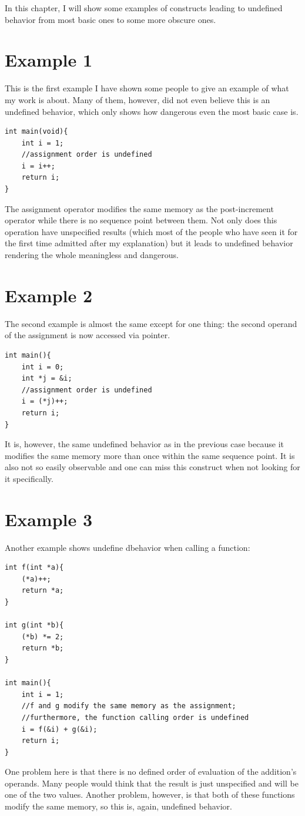 In this chapter, I will show some examples of constructs leading to undefined behavior from most basic ones to some more obscure ones.

\section{Example 1}\label{example1}
This is the first example I have shown some people to give an example of what my work is about. Many of them, however, did not even believe this is an undefined behavior, which only shows how dangerous even the most basic case is.
\begin{lstlisting}
int main(void){
	int i = 1;
    //assignment order is undefined
	i = i++;
	return i;
}
\end{lstlisting}
The assignment operator modifies the same memory as the post-increment operator while there is no sequence point between them. Not only does this operation have unspecified results (which most of the people who have seen it for the first time admitted after my explanation) but it leads to undefined behavior rendering the whole meaningless and dangerous.

\section{Example 2}\label{example2}
The second example is almost the same except for one thing: the second operand of the assignment is now accessed via pointer.
\begin{lstlisting}
int main(){
	int i = 0;
	int *j = &i;
    //assignment order is undefined
	i = (*j)++;
    return i;
}
\end{lstlisting}\label{example2}
It is, however, the same undefined behavior as in the previous case because it modifies the same memory more than once within the same sequence point. It is also not so easily observable and one can miss this construct when not looking for it specifically.

\section{Example 3}\label{example3}
Another example shows undefine dbehavior when calling a function:
\begin{lstlisting}
int f(int *a){
    (*a)++;
    return *a;
}

int g(int *b){
    (*b) *= 2;
    return *b;
}

int main(){
    int i = 1;
    //f and g modify the same memory as the assignment;
    //furthermore, the function calling order is undefined
    i = f(&i) + g(&i);
    return i;
}
\end{lstlisting}\label{example3}
One problem here is that there is no defined order of evaluation of the addition's operands. Many people would think that the result is just unspecified and will be one of the two values. Another problem, however, is that both of these functions modify the same memory, so this is, again, undefined behavior.

